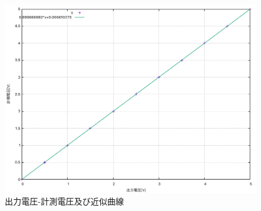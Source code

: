 \begin{enumerate}[実習2-1：]
\begin{figure}[h]
\centering
\includegraphics[scale=0.45]{./fig/RMSE.pdf}
\caption{出力電圧-計測電圧及び近似曲線}
\label{fig:RMSE}
\end{figure}
\end{enumerate}

